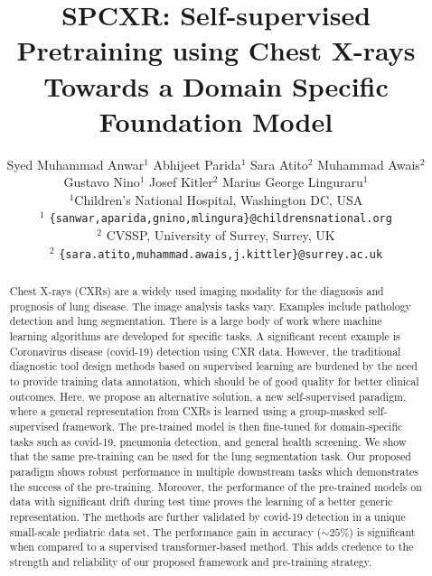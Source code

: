 \documentclass[10pt,journal,compsoc]{IEEEtran}
\begin{document}
\title{SPCXR: Self-supervised Pretraining using Chest X-rays Towards a Domain Specific Foundation Model}

\author{Syed Muhammad Anwar$^1$ \vspace{0.1cm}
\qquad
Abhijeet Parida$^1$
\qquad
Sara Atito$^2$
\qquad
Muhammad Awais$^2$ \\
\qquad
Gustavo Nino$^1$
\qquad
Josef Kitler$^2$
\qquad
Marius George Linguraru$^1$ \vspace{0.1cm} \\
\qquad
$^1$Children's National Hospital, Washington DC, USA\\
$^1$ {\tt\small \{sanwar,aparida,gnino,mlingura\}@childrensnational.org}\\
$^2$ CVSSP, University of Surrey, Surrey, UK\\
$^2$ {\tt\small \{sara.atito,muhammad.awais,j.kittler\}@surrey.ac.uk}}
\maketitle

\begin{abstract}
   Chest X-rays (CXRs) are a widely used imaging modality for the diagnosis and prognosis of lung disease. The image analysis tasks vary. Examples include pathology detection and lung segmentation. There is a large body of work where machine learning algorithms are developed for specific tasks. A significant recent example is Coronavirus disease (covid-19) detection using CXR data. However, the traditional diagnostic tool design methods based on supervised learning are burdened by the need to provide training data annotation, which should be of good quality for better clinical outcomes. Here, we propose an alternative solution, a new self-supervised paradigm, where a general representation from CXRs is learned using a group-masked self-supervised framework. The pre-trained model is then fine-tuned for domain-specific tasks such as covid-19, pneumonia detection, and general health screening. We show that the same pre-training can be used for the lung segmentation task. Our proposed paradigm shows robust performance in multiple downstream tasks which demonstrates the success of the pre-training. Moreover, the performance of the pre-trained models on data with significant drift during test time proves the learning of a better generic representation. The methods are further validated by covid-19 detection in a unique small-scale pediatric data set. The performance gain in accuracy ($\sim25\%$) is significant when compared to a supervised transformer-based method. This adds credence to the strength and reliability of our proposed framework and pre-training strategy.
\end{abstract}
\end{document}
